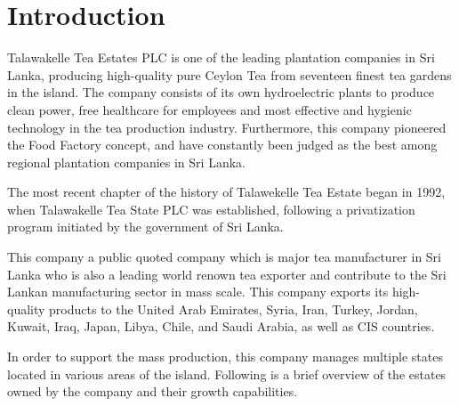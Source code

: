 \documentclass[12pt]{report}
\begin{document}
\newpage
\setcounter{secnumdepth}{3} %
\onehalfspacing

\chapter{Introduction}
Talawakelle Tea Estates PLC is one of the leading plantation companies in Sri Lanka, producing high-quality pure Ceylon Tea from seventeen finest tea gardens in the island.  The company consists of its own hydroelectric plants to produce clean power, free healthcare for employees and most effective and hygienic technology in the tea production industry. Furthermore, this company pioneered the Food Factory concept, and have constantly been judged as the best among regional plantation companies in Sri Lanka.

The most recent chapter of the history of Talawekelle Tea Estate began in 1992, when Talawakelle Tea State PLC was established, following a privatization program initiated by the government of Sri Lanka.

This company a public quoted company which is major tea manufacturer in Sri Lanka who is also a leading world renown tea exporter and contribute to the Sri Lankan manufacturing sector in mass scale.  This company exports its high-quality products to the United Arab Emirates, Syria, Iran, Turkey, Jordan, Kuwait, Iraq, Japan, Libya, Chile, and Saudi Arabia, as well as CIS countries.

In order to support the mass production, this company manages multiple states located in various areas of the island. Following is a brief overview of the estates owned by the company and their growth capabilities.
\end{document}
